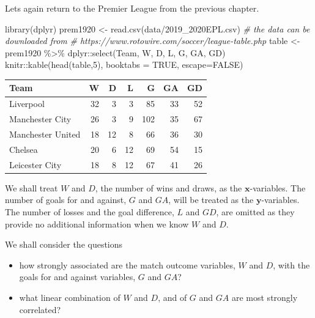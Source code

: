 \documentclass[
]{book}
\newenvironment{Shaded}{\begin{snugshade}}{\end{snugshade}}
\newcommand{\AttributeTok}[1]{\textcolor[rgb]{0.77,0.63,0.00}{#1}}
\newcommand{\CommentTok}[1]{\textcolor[rgb]{0.56,0.35,0.01}{\textit{#1}}}
\newcommand{\ConstantTok}[1]{\textcolor[rgb]{0.00,0.00,0.00}{#1}}
\newcommand{\DecValTok}[1]{\textcolor[rgb]{0.00,0.00,0.81}{#1}}
\newcommand{\FunctionTok}[1]{\textcolor[rgb]{0.00,0.00,0.00}{#1}}
\newcommand{\NormalTok}[1]{#1}
\newcommand{\OtherTok}[1]{\textcolor[rgb]{0.56,0.35,0.01}{#1}}
\newcommand{\SpecialCharTok}[1]{\textcolor[rgb]{0.00,0.00,0.00}{#1}}
\newcommand{\StringTok}[1]{\textcolor[rgb]{0.31,0.60,0.02}{#1}}
\providecommand{\tightlist}{%
  \setlength{\itemsep}{0pt}\setlength{\parskip}{0pt}}
\theoremstyle{definition}
\theoremstyle{definition}
\theoremstyle{definition}
\theoremstyle{definition}
\theoremstyle{remark}
\begin{document}
Lets again return to the Premier League from the previous chapter.

\begin{Shaded}
\begin{Highlighting}[]
\FunctionTok{library}\NormalTok{(dplyr)}
\NormalTok{prem1920 }\OtherTok{\textless{}{-}} \FunctionTok{read.csv}\NormalTok{(}\StringTok{\textquotesingle{}data/2019\_2020EPL.csv\textquotesingle{}}\NormalTok{) }
\CommentTok{\# the data can be downloaded from }
\CommentTok{\# https://www.rotowire.com/soccer/league{-}table.php}
\NormalTok{table }\OtherTok{\textless{}{-}}\NormalTok{ prem1920 }\SpecialCharTok{\%\textgreater{}\%}\NormalTok{ dplyr}\SpecialCharTok{::}\FunctionTok{select}\NormalTok{(Team, W, D, L, G, GA, GD) }
\NormalTok{knitr}\SpecialCharTok{::}\FunctionTok{kable}\NormalTok{(}\FunctionTok{head}\NormalTok{(table,}\DecValTok{5}\NormalTok{), }\AttributeTok{booktabs =} \ConstantTok{TRUE}\NormalTok{, }\AttributeTok{escape=}\ConstantTok{FALSE}\NormalTok{)}
\end{Highlighting}
\end{Shaded}

\begin{tabular}{lrrrrrr}
\toprule
Team & W & D & L & G & GA & GD\\
\midrule
Liverpool & 32 & 3 & 3 & 85 & 33 & 52\\
Manchester City & 26 & 3 & 9 & 102 & 35 & 67\\
Manchester United & 18 & 12 & 8 & 66 & 36 & 30\\
Chelsea & 20 & 6 & 12 & 69 & 54 & 15\\
Leicester City & 18 & 8 & 12 & 67 & 41 & 26\\
\bottomrule
\end{tabular}

We shall treat \(W\) and \(D\), the number of wins and draws, as the \(\mathbf x\)-variables. The number of goals for and against, \(G\) and \(GA\), will be treated as the \(\mathbf y\)-variables. The number of losses and the goal difference, \(L\) and \(GD\), are omitted as they provide no additional information when we know \(W\) and \(D\).

We shall consider the questions

\begin{itemize}
\tightlist
\item
  how strongly associated are the match outcome variables, \(W\) and \(D\), with the goals for and against variables, \(G\) and \(GA\)?
\item
  what linear combination of \(W\) and \(D\), and of \(G\) and \(GA\) are most strongly correlated?
\end{itemize}
\end{document}
